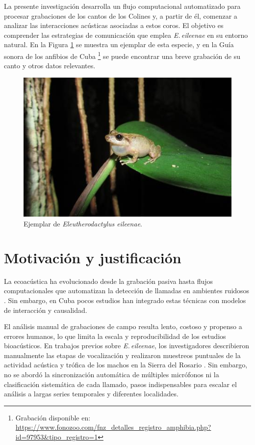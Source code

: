 La presente investigación desarrolla un flujo computacional automatizado para 
procesar grabaciones de los cantos de los Colines y, a partir de él, comenzar a analizar 
 las interacciones acústicas asociadas a estos coros. 
El objetivo es comprender las 
estrategias de comunicación que emplea \emph{E.\,eileenae} en su entorno natural.
En la Figura \ref{fig:colin} se muestra un ejemplar de esta especie, y en la
Guía sonora de los anfibios de Cuba 
\footnote{Grabación disponible en: \url{https://www.fonozoo.com/fnz_detalles_registro_amphibia.php?id=97953&tipo_registro=1}}
se puede encontrar una breve grabación de su canto y otros datos relevantes.\\

\begin{figure}[h!]
    \centering
    \includegraphics[width=\columnwidth]{Graphics/colin.jpg}
    \caption{Ejemplar de \emph{Eleutherodactylus eileenae}.}
    \label{fig:colin}
\end{figure}


\section{Motivación y justificación}
\label{sec:motivacion_justificacion}

La ecoacústica ha evolucionado desde la grabación pasiva hasta flujos computacionales 
que automatizan la detección de llamadas en ambientes ruidosos 
\cite{acevedo2009automated,blumstein2011acoustic}. Sin embargo, en Cuba pocos estudios 
han integrado estas técnicas con modelos de interacción y causalidad.

El análisis manual de grabaciones de campo resulta lento, 
costoso y propenso a errores humanos, lo que limita la escala y 
reproducibilidad de los estudios bioacústicos. En trabajos 
previos sobre \emph{E.\,eileenae}, los investigadores 
describieron manualmente las etapas de vocalización y 
realizaron muestreos puntuales de la actividad acústica y 
trófica de los machos en la Sierra del Rosario \cite{alonso2001patrones}. 
Sin embargo, no se abordó la sincronización automática de 
múltiples micrófonos ni la clasificación sistemática de cada 
llamado, pasos indispensables para escalar el análisis a largas 
series temporales y diferentes localidades.

